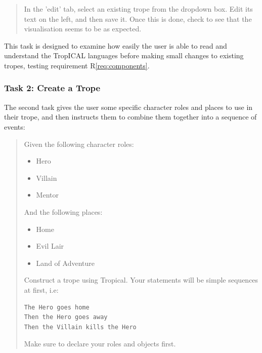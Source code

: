 \documentclass[11pt]{report}
\begin{document}
\begin{framed}
\begin{quote}
In the 'edit' tab, select an existing trope from the dropdown box. Edit its text on the left, and then save it. Once this is done, check to see that the visualisation seems to be as expected.
\end{quote}
\end{framed}

This task is designed to examine how easily the user is able to read and
understand the TropICAL languages before making small changes to existing
tropes, testing requirement R\ref{req:components}.

\subsubsection*{Task 2: Create a Trope}
\label{sec:org96a6276}

The second task gives the user some specific character roles and places to use
in their trope, and then instructs them to combine them together into a sequence
of events:

\begin{framed}
\begin{quote}
Given the following character roles:

\begin{itemize}
\item Hero
\item Villain
\item Mentor
\end{itemize}

And the following places:

\begin{itemize}
\item Home
\item Evil Lair
\item Land of Adventure
\end{itemize}

Construct a trope using Tropical. Your statements will be simple sequences at first, i.e:

\begin{verbatim}
The Hero goes home
Then the Hero goes away
Then the Villain kills the Hero
\end{verbatim}

Make sure to declare your roles and objects first.
\end{quote}
\end{framed}
\end{document}
